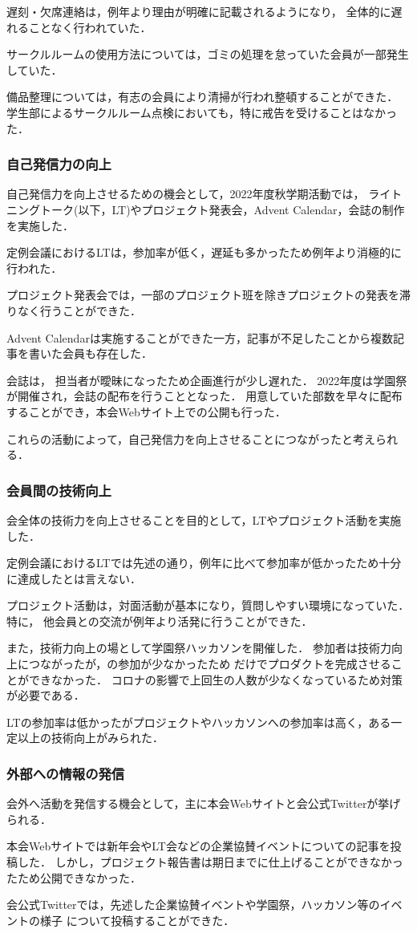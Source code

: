     遅刻・欠席連絡は，例年より理由が明確に記載されるようになり，
    全体的に遅れることなく行われていた．
    
    サークルルームの使用方法については，ゴミの処理を怠っていた会員が一部発生していた．
    
    備品整理については，有志の会員により清掃が行われ整頓することができた．
    学生部によるサークルルーム点検においても，特に戒告を受けることはなかった．

\subsubsection*{自己発信力の向上}
    自己発信力を向上させるための機会として，2022年度秋学期活動では，
    ライトニングトーク(以下，LT)やプロジェクト発表会，Advent Calendar，会誌の制作を実施した．

    定例会議におけるLTは，参加率が低く，遅延も多かったため例年より消極的に行われた．

    プロジェクト発表会では，一部のプロジェクト班を除きプロジェクトの発表を滞りなく行うことができた．
    
    Advent Calendarは実施することができた一方，記事が不足したことから複数記事を書いた会員も存在した．

    会誌は，
    担当者が曖昧になったため企画進行が少し遅れた．
    2022年度は学園祭が開催され，会誌の配布を行うこととなった．
    用意していた部数を早々に配布することができ，本会Webサイト上での公開も行った．
    
    これらの活動によって，自己発信力を向上させることにつながったと考えられる．
    
\subsubsection*{会員間の技術向上}
    会全体の技術力を向上させることを目的として，LTやプロジェクト活動を実施した．

    定例会議におけるLTでは先述の通り，例年に比べて参加率が低かったため十分に達成したとは言えない．

    プロジェクト活動は，対面活動が基本になり，質問しやすい環境になっていた．
    特に，
    他会員との交流が例年より活発に行うことができた．

    また，技術力向上の場として学園祭ハッカソンを開催した．
    参加者は技術力向上につながったが，\thirdGrade{}の参加が少なかったため
    \firstGrade{}だけでプロダクトを完成させることができなかった．
    コロナの影響で上回生の人数が少なくなっているため対策が必要である．
    
    LTの参加率は低かったがプロジェクトやハッカソンへの参加率は高く，ある一定以上の技術向上がみられた．

\subsubsection*{外部への情報の発信}
    会外へ活動を発信する機会として，主に本会Webサイトと会公式Twitterが挙げられる．

    本会Webサイトでは新年会やLT会などの企業協賛イベントについての記事を投稿した．
    しかし，プロジェクト報告書は期日までに仕上げることができなかったため公開できなかった．

    会公式Twitterでは，先述した企業協賛イベントや学園祭，ハッカソン等のイベントの様子
    について投稿することができた．
